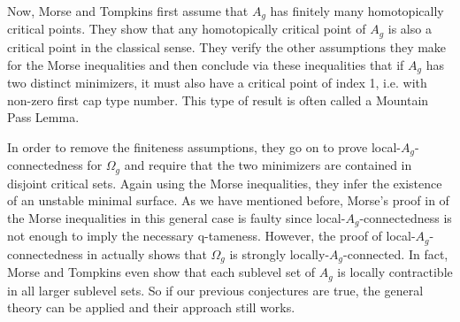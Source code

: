Now, Morse and Tompkins first assume that $A_g$ has finitely many homotopically critical points. They show that any homotopically critical point of $A_g$ is also a critical point in the classical sense. They verify the other assumptions they make for the Morse inequalities and then conclude via these inequalities that if $A_g$ has two distinct minimizers, it must also have a critical point of index 1, i.e. with non-zero first cap type number. This type of result is often called a Mountain Pass Lemma. 

In order to remove the finiteness assumptions, they go on to prove local-$A_g$-connectedness for $\Omega_g$ and require that the two minimizers are contained in disjoint critical sets. Again using the Morse inequalities, they infer the existence of an unstable minimal surface. As we have mentioned before, Morse's proof in \cite{Morse.1940} of the Morse inequalities in this general case is faulty since local-$A_g$-connectedness is not enough to imply the necessary q-tameness. However, the proof of local-$A_g$-connectedness in \cite{Morse.1939} actually shows that $\Omega_g$ is strongly locally-$A_g$-connected. In fact, Morse and Tompkins even show that each sublevel set of $A_g$ is locally contractible in all larger sublevel sets. So if our previous conjectures are true, the general theory can be applied and their approach still works.